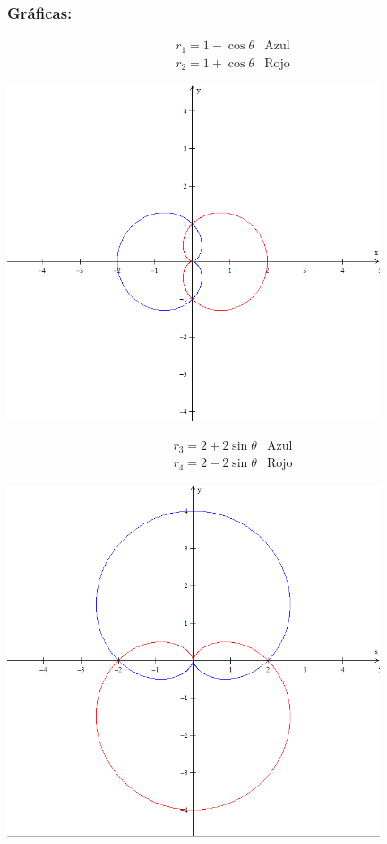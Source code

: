 \documentclass[letterpaper, 12pt]{article}
\begin{document}
\subsubsection*{Gráficas:}
\[\begin{matrix}
    r_1=1-\cos\theta&\text{Azul}\\
    r_2=1+\cos\theta&\text{Rojo}
\end{matrix}\]
\begin{center}
    \includegraphics[width=11cm]{Capture.PNG}
\end{center}
\[\begin{matrix}
    r_3=2+2\sin\theta&\text{Azul}\\
    r_4=2-2\sin\theta&\text{Rojo}
\end{matrix}\]
\begin{center}
    \includegraphics[width=11cm]{Capture2.PNG}
\end{center}
\end{document}

